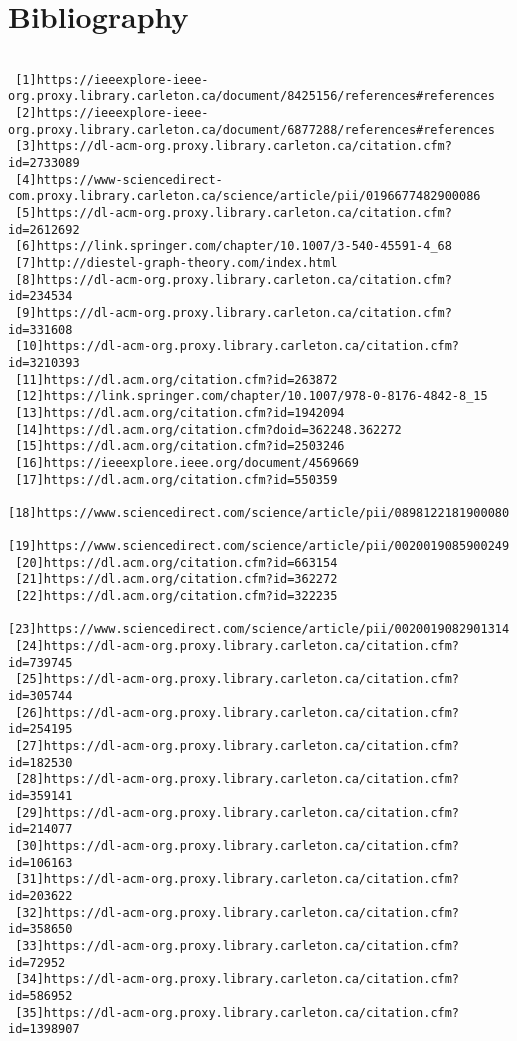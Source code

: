 \documentclass[]{article}
\begin{document}
 \section{Bibliography}
 \begin{verbatim}

 [1]https://ieeexplore-ieee-org.proxy.library.carleton.ca/document/8425156/references#references
 [2]https://ieeexplore-ieee-org.proxy.library.carleton.ca/document/6877288/references#references
 [3]https://dl-acm-org.proxy.library.carleton.ca/citation.cfm?id=2733089
 [4]https://www-sciencedirect-com.proxy.library.carleton.ca/science/article/pii/0196677482900086
 [5]https://dl-acm-org.proxy.library.carleton.ca/citation.cfm?id=2612692
 [6]https://link.springer.com/chapter/10.1007/3-540-45591-4_68
 [7]http://diestel-graph-theory.com/index.html
 [8]https://dl-acm-org.proxy.library.carleton.ca/citation.cfm?id=234534 
 [9]https://dl-acm-org.proxy.library.carleton.ca/citation.cfm?id=331608
 [10]https://dl-acm-org.proxy.library.carleton.ca/citation.cfm?id=3210393
 [11]https://dl.acm.org/citation.cfm?id=263872
 [12]https://link.springer.com/chapter/10.1007/978-0-8176-4842-8_15
 [13]https://dl.acm.org/citation.cfm?id=1942094
 [14]https://dl.acm.org/citation.cfm?doid=362248.362272
 [15]https://dl.acm.org/citation.cfm?id=2503246
 [16]https://ieeexplore.ieee.org/document/4569669
 [17]https://dl.acm.org/citation.cfm?id=550359
 [18]https://www.sciencedirect.com/science/article/pii/0898122181900080
 [19]https://www.sciencedirect.com/science/article/pii/0020019085900249
 [20]https://dl.acm.org/citation.cfm?id=663154
 [21]https://dl.acm.org/citation.cfm?id=362272
 [22]https://dl.acm.org/citation.cfm?id=322235
 [23]https://www.sciencedirect.com/science/article/pii/0020019082901314
 [24]https://dl-acm-org.proxy.library.carleton.ca/citation.cfm?id=739745
 [25]https://dl-acm-org.proxy.library.carleton.ca/citation.cfm?id=305744
 [26]https://dl-acm-org.proxy.library.carleton.ca/citation.cfm?id=254195
 [27]https://dl-acm-org.proxy.library.carleton.ca/citation.cfm?id=182530
 [28]https://dl-acm-org.proxy.library.carleton.ca/citation.cfm?id=359141
 [29]https://dl-acm-org.proxy.library.carleton.ca/citation.cfm?id=214077
 [30]https://dl-acm-org.proxy.library.carleton.ca/citation.cfm?id=106163
 [31]https://dl-acm-org.proxy.library.carleton.ca/citation.cfm?id=203622
 [32]https://dl-acm-org.proxy.library.carleton.ca/citation.cfm?id=358650
 [33]https://dl-acm-org.proxy.library.carleton.ca/citation.cfm?id=72952
 [34]https://dl-acm-org.proxy.library.carleton.ca/citation.cfm?id=586952
 [35]https://dl-acm-org.proxy.library.carleton.ca/citation.cfm?id=1398907

\end{verbatim}
\end{document}
